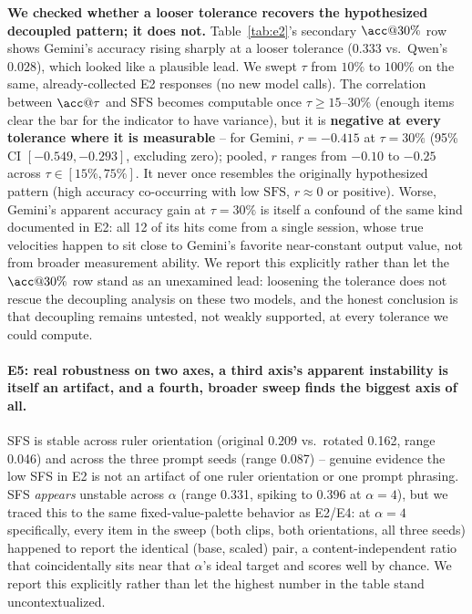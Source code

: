 \documentclass[11pt]{article}
\newcommand{\sfs}{\mathrm{SFS}}
\begin{document}
\noindent\textbf{We checked whether a looser tolerance recovers the
hypothesized decoupled pattern; it does not.} Table~\ref{tab:e2}'s secondary
$\acc@30\%$ row shows Gemini's accuracy rising sharply at a looser tolerance
($0.333$ vs.\ Qwen's $0.028$), which looked like a plausible lead. We swept
$\tau$ from $10\%$ to $100\%$ on the same, already-collected E2 responses (no
new model calls). The correlation between $\acc@\tau$ and $\sfs$ becomes
computable once $\tau\!\ge\!15$--$30\%$ (enough items clear the bar for the
indicator to have variance), but it is \textbf{negative at every tolerance
where it is measurable} -- for Gemini, $r=-0.415$ at $\tau{=}30\%$ (95\% CI
$[-0.549,-0.293]$, excluding zero); pooled, $r$ ranges from $-0.10$ to $-0.25$
across $\tau\!\in\![15\%,75\%]$. It never once resembles the originally
hypothesized pattern (high accuracy co-occurring with low $\sfs$,
$r\!\approx\!0$ or positive). Worse, Gemini's apparent accuracy gain at
$\tau{=}30\%$ is itself a confound of the same kind documented in E2: all 12 of
its hits come from a single session, whose true velocities happen to sit close
to Gemini's favorite near-constant output value, not from broader measurement
ability. We report this explicitly rather than let the $\acc@30\%$ row stand as
an unexamined lead: loosening the tolerance does not rescue the decoupling
analysis on these two models, and the honest conclusion is that decoupling
remains untested, not weakly supported, at every tolerance we could compute.

\paragraph{E5: real robustness on two axes, a third axis's apparent instability
is itself an artifact, and a fourth, broader sweep finds the biggest axis of
all.} SFS is stable across ruler orientation (original 0.209 vs.\ rotated
0.162, range 0.046) and across the three prompt seeds (range 0.087) --
genuine evidence the low SFS in E2 is not an artifact of one ruler orientation
or one prompt phrasing. SFS \emph{appears} unstable across $\alpha$ (range
0.331, spiking to 0.396 at $\alpha{=}4$), but we traced this to the same
fixed-value-palette behavior as E2/E4: at $\alpha{=}4$ specifically, every item
in the sweep (both clips, both orientations, all three seeds) happened to
report the identical (base, scaled) pair, a content-independent ratio that
coincidentally sits near that $\alpha$'s ideal target and scores well by
chance. We report this explicitly rather than let the highest number in the
table stand uncontextualized.
\end{document}
